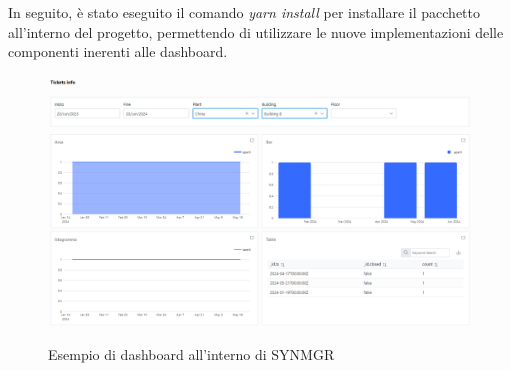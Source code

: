In seguito, è stato eseguito il comando \textit{yarn install} per installare il pacchetto all'interno del progetto, permettendo di utilizzare le nuove implementazioni delle
componenti inerenti alle dashboard.

\begin{figure}[H]
    \centering
    \includegraphics[alt={Esempio di dashboard all'interno di SYNMGR}, width=1 \columnwidth]{img/synmgr-dashboard.png}
    \caption{Esempio di dashboard all'interno di SYNMGR}
    \label{fig:synmgr_dashboard}
\end{figure}